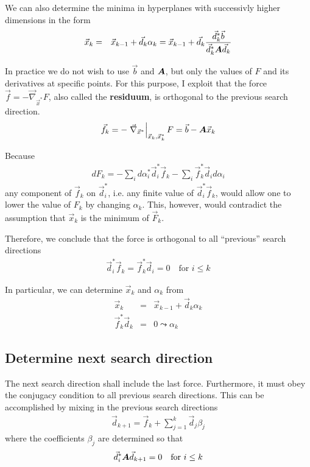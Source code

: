 \documentclass[11pt,a4paper]{report}
\begin{document}
We can also determine the minima in hyperplanes with successivly  
higher dimensions in the form
\begin{eqnarray}
\vec{x}_k&=&
\vec{x}_{k-1}+\vec{d}_k\alpha_k
=\vec{x}_{k-1}+\vec{d}_k
\frac{\vec{d}^*_k\vec{b}}{\vec{d}^*_k\bm{A}\vec{d}_k}
\end{eqnarray}

In practice we do not wish to use $\vec{b}$ and $\bm{A}$, but only
the values of $F$ and its derivatives at specific points. For this
purpose, I exploit that the force
$\vec{f}=-\vec{\nabla}_{\vec{x}^*}F$, also called the
\textbf{residuum}, is orthogonal to the previous
search direction.
\begin{eqnarray}
\vec{f}_k=-\left.\vec{\nabla}_{\vec{x}^*}\right|_{\vec{x}_k,\vec{x}_k^*} F
=\vec{b}-\bm{A}\vec{x}_k
\label{eq:cgforceofab}
\end{eqnarray}

Because
\begin{eqnarray}
dF_k=
-\sum_i d\alpha_i^* \vec{d}_i^* \vec{f}_k
-\sum_i \vec{f}_k^* \vec{d}_id\alpha_i
\end{eqnarray}
any component of $\vec{f}_k$ on $\vec{d}_i^*$, i.e. any finite value
of $\vec{d}^*_i\vec{f}_k$, would allow one to lower the value of $F_k$
by changing $\alpha_k$. This, however, would contradict the assumption
that $\vec{x}_k$ is the minimum of $\vec{F}_k$.

Therefore, we conclude that the force is orthogonal to all ``previous''
search directions
\begin{eqnarray}
\vec{d}_i^*\vec{f}_k=\vec{f}_k^*\vec{d}_i=0\quad\text{for $i\le k$}
\label{eq:cgorthogonalityforceandsearch}
\end{eqnarray}

In particular, we can determine $\vec{x}_k$ and $\alpha_k$ from 
\begin{eqnarray}
\vec{x}_k&=&\vec{x}_{k-1}+\vec{d}_k\alpha_k
\label{eq:cgxkwithalphaka}
\\
\vec{f}_k^*\vec{d}_k&=&0\leadsto\alpha_k
\label{eq:cgxkwithalphakb}
\end{eqnarray}

\subsection{Determine next search direction}
The next search direction shall include the last force.  Furthermore,
it must obey the conjugacy condition to all previous search
directions. This can be accomplished by mixing in the previous search
directions
\begin{eqnarray}
\vec{d}_{k+1}=\vec{f}_k+\sum_{j=1}^{k}\vec{d}_j\beta_j
\label{eq:cgnewsearch0}
\end{eqnarray}
where the coefficients $\beta_j$ are determined so that
\begin{eqnarray}
\vec{d}^*_i\bm{A}\vec{d}_{k+1}=0\quad\text{for $i\le k$}
\end{eqnarray}
\end{document}
